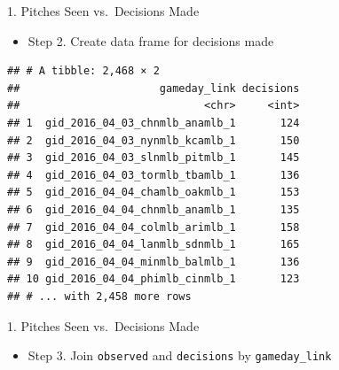 \begin{frame}[fragile]{1. Pitches Seen vs.~Decisions Made}

\begin{itemize}
\tightlist
\item
  Step 2. Create data frame for decisions made
\end{itemize}

\footnotesize

\begin{Shaded}
\end{Shaded}

\begin{verbatim}
## # A tibble: 2,468 × 2
##                      gameday_link decisions
##                             <chr>     <int>
## 1  gid_2016_04_03_chnmlb_anamlb_1       124
## 2  gid_2016_04_03_nynmlb_kcamlb_1       150
## 3  gid_2016_04_03_slnmlb_pitmlb_1       145
## 4  gid_2016_04_03_tormlb_tbamlb_1       136
## 5  gid_2016_04_04_chamlb_oakmlb_1       153
## 6  gid_2016_04_04_chnmlb_anamlb_1       135
## 7  gid_2016_04_04_colmlb_arimlb_1       158
## 8  gid_2016_04_04_lanmlb_sdnmlb_1       165
## 9  gid_2016_04_04_minmlb_balmlb_1       136
## 10 gid_2016_04_04_phimlb_cinmlb_1       123
## # ... with 2,458 more rows
\end{verbatim}

\end{frame}

\begin{frame}[fragile]{1. Pitches Seen vs.~Decisions Made}

\begin{itemize}
\tightlist
\item
  Step 3. Join \texttt{observed} and \texttt{decisions} by
  \texttt{gameday\_link}
\end{itemize}

\footnotesize

\begin{Shaded}
\begin{Highlighting}[]
\StringTok{ } \NormalTok{)}
\end{Highlighting}
\end{Shaded}

\end{frame}

